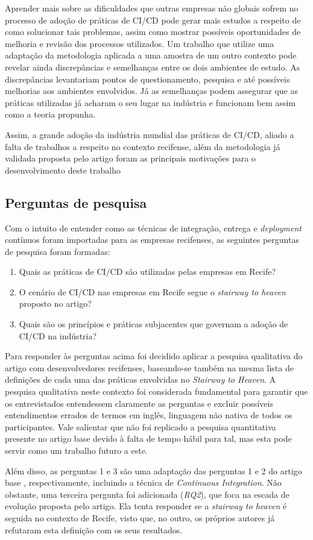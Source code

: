 Aprender mais sobre as dificuldades que outras empresas não globais sofrem no processo de adoção de práticas de CI/CD pode gerar mais estudos a respeito de como solucionar tais problemas, assim como mostrar possíveis oportunidades de melhoria e revisão dos processos utilizados. Um trabalho que utilize uma adaptação da metodologia aplicada a uma amostra de um outro contexto pode revelar ainda discrepâncias e semelhanças entre os dois ambientes de estudo. As discrepâncias levantariam pontos de questionamento, pesquisa e até possíveis melhorias aos ambientes envolvidos. Já as semelhanças podem assegurar que as práticas utilizadas já acharam o seu lugar na indústria e funcionam bem assim como a teoria propunha.

Assim, a grande adoção da indústria mundial das práticas de CI/CD, aliado a falta de trabalhos a respeito no contexto recifense, além da metodologia já validada proposta pelo artigo foram as principais motivações para o desenvolvimento deste trabalho

\subsection{Perguntas de pesquisa} 
Com o intuito de entender como as técnicas de integração, entrega e \emph{deployment} contínuos foram importadas para as empresas recifenses, as seguintes perguntas de pesquisa foram formadas:

\begin{enumerate}
\item Quais as práticas de CI/CD são utilizadas pelas empresas em Recife?
\item O cenário de CI/CD nas empresas em Recife segue o \emph{stairway to heaven} proposto no artigo?
\item Quais são os princípios e práticas subjacentes que governam a adoção de CI/CD na indústria?
\end{enumerate}

Para responder às perguntas acima foi decidido aplicar a pesquisa qualitativa do artigo \cite{empiricalStudy2016} com desenvolvedores recifenses, baseando-se também na mesma lista de definições de cada uma das práticas envolvidas no \emph{Stairway to Heaven}. A pesquisa qualitativa neste contexto foi considerada fundamental para garantir que os entrevistados entendessem claramente as perguntas e excluir possíveis entendimentos errados de termos em inglês, linguagem não nativa de todos os participantes. Vale salientar que não foi replicado a pesquisa quantitativa presente no artigo base devido à falta de tempo hábil para tal, mas esta pode servir como um trabalho futuro a este.

Além disso, as perguntas 1 e 3 são uma adaptação das perguntas 1 e 2 do artigo base \cite{empiricalStudy2016}, respectivamente, incluindo a técnica de \emph{Continuous Integration}. Não obstante, uma terceira pergunta foi adicionada (\emph{RQ2}), que foca na escada de evolução proposta pelo artigo. Ela tenta responder se a \emph{stairway to heaven} é seguida no contexto de Recife, visto que, no outro, os próprios autores já refutaram esta definição com os seus resultados.
